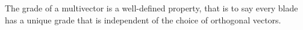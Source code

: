 \begin{lemma}\label{l:grade-definiteness}
	The grade of a multivector is a well-defined property, that is to say every blade has a unique grade that is independent of the choice of orthogonal vectors.
\end{lemma}
